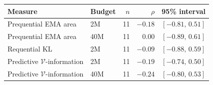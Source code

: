\begin{tabular}{@{}llrrl@{}}
\toprule
Measure & Budget & $n$ & $\rho$ & 95\% interval\\
\midrule
Prequential EMA area & 2M & 11 & $-0.18$ & $[-0.81,\,0.51]$ \\
Prequential EMA area & 40M & 11 & $0.00$ & $[-0.89,\,0.61]$ \\
Requential KL & 2M & 11 & $-0.09$ & $[-0.88,\,0.59]$ \\
Predictive $\mathcal V$-information & 2M & 11 & $-0.19$ & $[-0.74,\,0.50]$ \\
Predictive $\mathcal V$-information & 40M & 11 & $-0.24$ & $[-0.80,\,0.53]$ \\
\bottomrule
\end{tabular}
